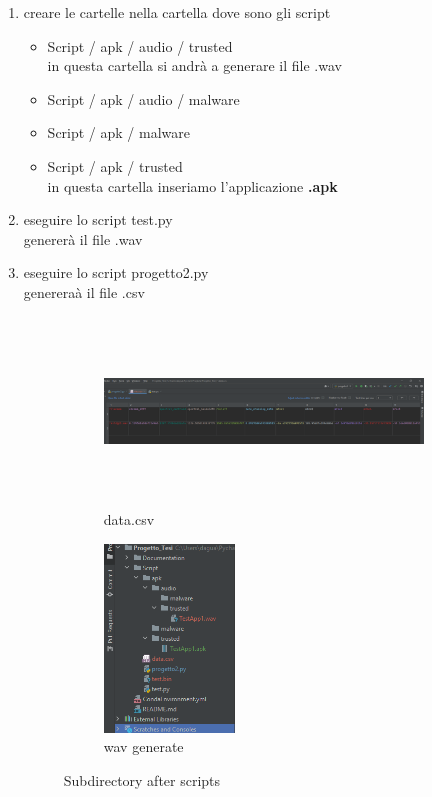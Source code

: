 \documentclass{article}
\begin{document}
\begin{enumerate}
   \item creare le cartelle nella cartella dove sono gli script 
    \begin{itemize}
        \item Script / apk / audio / trusted
        \\in questa cartella si andrà a generare il file .wav
        \item Script / apk / audio / malware
        \item Script / apk / malware 
        \item Script / apk / trusted 
        \\in questa cartella inseriamo l'applicazione \textbf{.apk}
    \end{itemize}
    \item eseguire lo script test.py
    \\genererà il file .wav 
    \item eseguire lo script progetto2.py
    \\genereraà il file .csv
    \begin{figure}[h]
    \begin{subfigure}{0.5\textwidth}
    \includegraphics[width=0.9\linewidth, height=5cm]{image/Screenshot (34).png} 
    \caption{data.csv}
    \label{fig:subim1}
    \end{subfigure}
    \begin{subfigure}{0.5\textwidth}
    \includegraphics[width=0.9\linewidth, height=5cm]{image/Screenshot (33).png}
    \caption{wav generate}
    \label{fig:subim2}
    \end{subfigure}
    \caption{Subdirectory after scripts}
    \label{fig:image2}
    \end{figure}
\end{enumerate}
\end{document}
